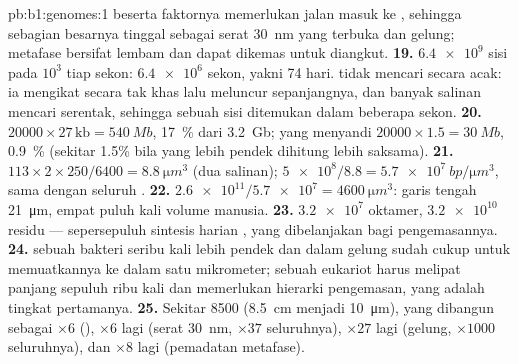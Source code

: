 \begin{solution}{pb:b1:genomes:1}
beserta faktornya memerlukan jalan masuk ke , sehingga sebagian
besarnya tinggal sebagai serat \qty{30}{nm} yang terbuka dan gelung;
 metafase bersifat lembam dan dapat dikemas untuk diangkut.
\textbf{19.} $\num{6.4e9}$ sisi pada $10^3$ tiap sekon: $\num{6.4e6}$
sekon, yakni 74 hari.  tidak mencari secara acak: ia mengikat
 secara tak khas lalu meluncur sepanjangnya, dan banyak salinan
mencari serentak, sehingga sebuah sisi ditemukan dalam beberapa sekon.
\textbf{20.} $\num{20000}\times 27\,\mathrm{kb} = \qty{540}{Mb}$,
\qty{17}{\%} dari \qty{3.2}{Gb}; yang menyandi $\num{20000}\times 1.5 =
\qty{30}{Mb}$, \qty{0.9}{\%} (sekitar 1.5\% bila  yang lebih pendek
dihitung lebih saksama).
\textbf{21.} $113\times 2\times 250/6400 = \qty{8.8}{\micro m^3}$ (dua
salinan); $\num{5e8}/8.8 = \qty{5.7e7}{bp/\micro m^3}$, sama dengan
seluruh .
\textbf{22.} $\num{2.6e11}/\num{5.7e7} = \qty{4600}{\micro m^3}$:
garis tengah \qty{21}{\micro m}, empat puluh kali volume  manusia.
\textbf{23.} $\num{3.2e7}$ oktamer, $\num{3.2e10}$ residu ---
sepersepuluh sintesis  harian , yang dibelanjakan bagi
pengemasannya.
\textbf{24.}  sebuah bakteri seribu kali lebih pendek dan
 dalam gelung sudah cukup untuk memuatkannya ke dalam satu
mikrometer; sebuah eukariot harus melipat panjang sepuluh ribu kali
 dan memerlukan hierarki pengemasan, yang  adalah
tingkat pertamanya.
\textbf{25.} Sekitar \num{8500} (\qty{8.5}{cm} menjadi
\qty{10}{\micro m}), yang dibangun sebagai $\times 6$ (),
$\times 6$ lagi (serat \qty{30}{nm}, $\times 37$ seluruhnya),
$\times 27$ lagi (gelung, $\times 1000$ seluruhnya), dan $\times 8$
lagi (pemadatan metafase).
\end{solution}
